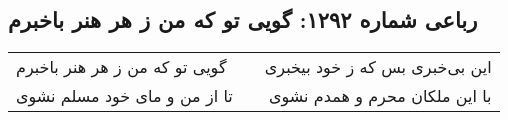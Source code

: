 \begin{center}
\section*{رباعی شماره ۱۲۹۲: گویی تو که من ز هر هنر باخبرم}
\label{sec:1292}
\begin{longtable}{l p{0.5cm} r}
گویی تو که من ز هر هنر باخبرم
&&
این بی‌خبری بس که ز خود بیخبری
\\
تا از من و مای خود مسلم نشوی
&&
با این ملکان محرم و همدم نشوی
\\
\end{longtable}
\end{center}
